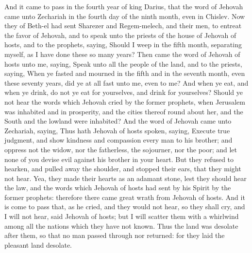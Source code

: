 And it came to pass in the fourth year of king Darius, that the word of Jehovah came unto Zechariah in the fourth day of the ninth month, even in Chislev. Now they of Beth-el had sent Sharezer and Regem-melech, and their men, to entreat the favor of Jehovah, and to speak unto the priests of the house of Jehovah of hosts, and to the prophets, saying, Should I weep in the fifth month, separating myself, as I have done these so many years? Then came the word of Jehovah of hosts unto me, saying, Speak unto all the people of the land, and to the priests, saying, When ye fasted and mourned in the fifth and in the seventh month, even these seventy years, did ye at all fast unto me, even to me? And when ye eat, and when ye drink, do not ye eat for yourselves, and drink for yourselves? Should ye not hear the words which Jehovah cried by the former prophets, when Jerusalem was inhabited and in prosperity, and the cities thereof round about her, and the South and the lowland were inhabited?  And the word of Jehovah came unto Zechariah, saying, Thus hath Jehovah of hosts spoken, saying, Execute true judgment, and show kindness and compassion every man to his brother; and oppress not the widow, nor the fatherless, the sojourner, nor the poor; and let none of you devise evil against his brother in your heart. But they refused to hearken, and pulled away the shoulder, and stopped their ears, that they might not hear. Yea, they made their hearts as an adamant stone, lest they should hear the law, and the words which Jehovah of hosts had sent by his Spirit by the former prophets: therefore there came great wrath from Jehovah of hosts. And it is come to pass that, as he cried, and they would not hear, so they shall cry, and I will not hear, said Jehovah of hosts; but I will scatter them with a whirlwind among all the nations which they have not known. Thus the land was desolate after them, so that no man passed through nor returned: for they laid the pleasant land desolate. 


